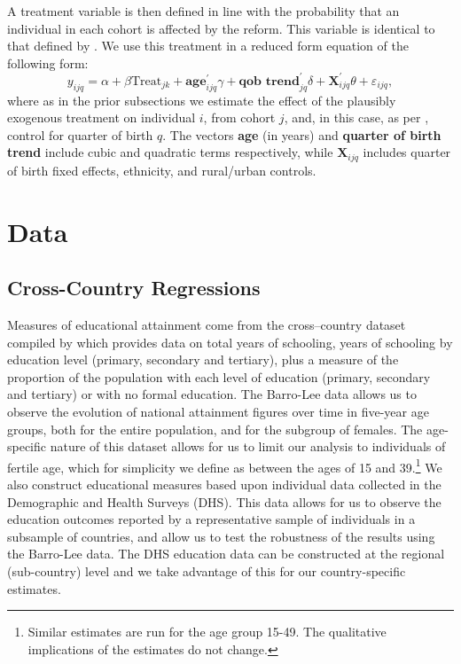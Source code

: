 \documentclass{article}[12pt,subeqn]
\begin{document}
\begin{spacing}{1.4}
A treatment variable is then defined in line with the probability that an 
individual in each cohort is affected by the reform.  This variable is 
identical to that defined by \citet{Chicoine2011}.  We use this treatment in a
reduced form equation of the following form:
\begin{equation}
\label{eqn:Kenya}
     y_{ijq}=\alpha+\beta\text{Treat}_{jk}+\textbf{age}_{ijq}^\prime\gamma+
     \textbf{qob trend}_{jq}^\prime \delta +\textbf{X}^\prime_{ijq}\theta+
     \varepsilon_{ijq},
\end{equation}
where as in the prior subsections we estimate the effect of the plausibly 
exogenous treatment on individual $i$, from cohort $j$, and, in this case, as per 
\citet{Chicoine2011}, control for quarter of birth $q$.  The vectors \textbf{age} 
(in years) and \textbf{quarter of birth trend} include cubic and quadratic terms 
respectively, while $\mathbf{X}_{ijq}$ includes quarter of birth fixed effects, 
ethnicity, and rural/urban controls.

\section{Data}
\label{scn:data}
\subsection{Cross-Country Regressions}
\label{sscn:datacross}

Measures of educational attainment come from the cross--country dataset compiled 
by \citet{BarroLee2013, BarroLee2010} which provides data on total years of 
schooling, years of schooling by education level (primary, secondary and 
tertiary), plus a measure of the proportion of the population with each level of 
education (primary, secondary and tertiary) or with no formal education.  The 
Barro-Lee data allows us to observe the evolution of national attainment figures 
over time in five-year age groups, both for the entire population, and for the 
subgroup of females. The age-specific nature of this dataset allows for us to 
limit our analysis to individuals of fertile age, which for simplicity we define 
as between the ages of 15 and 39.\footnote{Similar estimates are run for the age 
group 15-49. The qualitative implications of the estimates do not change.} We 
also construct educational measures based upon individual data collected in the 
Demographic and Health Surveys (DHS).  This data allows for us to observe the 
education outcomes reported by a representative sample of individuals in a 
subsample of countries, and allow us to test the robustness of the results using 
the Barro-Lee data. The DHS education data can be constructed at the regional 
(sub-country) level and we take advantage of this for our country-specific 
estimates.


\end{spacing}
\end{document}
